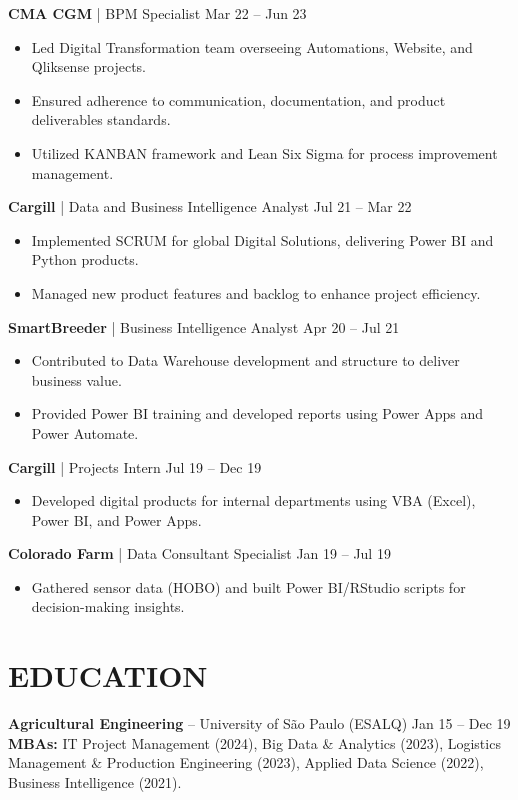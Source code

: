 \documentclass[9pt, letterpaper]{article}
\begin{document}
	\noindent \textbf{CMA CGM} | BPM Specialist \hfill Mar 22 -- Jun 23
	\begin{itemize}[noitemsep, topsep=1pt, leftmargin=1.5em, rightmargin=3.5cm]
		\item Led Digital Transformation team overseeing Automations, Website, and Qliksense projects.
		\item Ensured adherence to communication, documentation, and product deliverables standards.
		\item Utilized KANBAN framework and Lean Six Sigma for process improvement management.
	\end{itemize}
	
	\noindent \textbf{Cargill} | Data and Business Intelligence Analyst \hfill Jul 21 -- Mar 22
	\begin{itemize}[noitemsep, topsep=1pt, leftmargin=1.5em]
		\item Implemented SCRUM for global Digital Solutions, delivering Power BI and Python products.
		\item Managed new product features and backlog to enhance project efficiency.
	\end{itemize}
	
	\noindent \textbf{SmartBreeder} | Business Intelligence Analyst \hfill Apr 20 -- Jul 21
	\begin{itemize}[noitemsep, topsep=1pt, leftmargin=1.5em]
		\item Contributed to Data Warehouse development and structure to deliver business value.
		\item Provided Power BI training and developed reports using Power Apps and Power Automate.
	\end{itemize}
	
	\noindent \textbf{Cargill} | Projects Intern \hfill Jul 19 -- Dec 19
	\begin{itemize}[noitemsep, topsep=1pt, leftmargin=1.5em]
		\item Developed digital products for internal departments using VBA (Excel), Power BI, and Power Apps.
	\end{itemize}
	
	\noindent \textbf{Colorado Farm} | Data Consultant Specialist \hfill Jan 19 -- Jul 19
	\begin{itemize}[noitemsep, topsep=1pt, leftmargin=1.5em]
		\item Gathered sensor data (HOBO) and built Power BI/RStudio scripts for decision-making insights.
	\end{itemize}
	
	\section*{EDUCATION}
	\noindent \textbf{Agricultural Engineering} -- University of São Paulo (ESALQ) \hfill Jan 15 -- Dec 19 \\
	\noindent \textbf{MBAs:} IT Project Management (2024), Big Data \& Analytics (2023), Logistics Management \& Production Engineering (2023), Applied Data Science (2022), Business Intelligence (2021).
	
\end{document}
